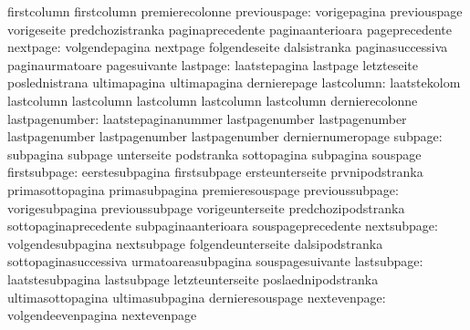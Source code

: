                            firstcolumn               firstcolumn
                           premierecolonne
             previouspage: vorigepagina              previouspage
                           vorigeseite               predchozistranka
                           paginaprecedente          paginaanterioara
                           pageprecedente
                 nextpage: volgendepagina            nextpage
                           folgendeseite             dalsistranka
                           paginasuccessiva          paginaurmatoare
                           pagesuivante
                 lastpage: laatstepagina             lastpage
                           letzteseite               poslednistrana
                           ultimapagina              ultimapagina
                           dernierepage
               lastcolumn: laatstekolom              lastcolumn
                           lastcolumn                lastcolumn
                           lastcolumn                lastcolumn
                           dernierecolonne
           lastpagenumber: laatstepaginanummer       lastpagenumber
                           lastpagenumber            lastpagenumber
                           lastpagenumber            lastpagenumber
                           derniernumeropage
                  subpage: subpagina                 subpage
                           unterseite                podstranka
                           sottopagina               subpagina
                           souspage
             firstsubpage: eerstesubpagina           firstsubpage
                           ersteunterseite           prvnipodstranka
                           primasottopagina          primasubpagina
                           premieresouspage
          previoussubpage: vorigesubpagina           previoussubpage
                           vorigeunterseite          predchozipodstranka
                           sottopaginaprecedente     subpaginaanterioara
                           souspageprecedente
              nextsubpage: volgendesubpagina         nextsubpage
                           folgendeunterseite        dalsipodstranka
                           sottopaginasuccessiva     urmatoareasubpagina
                           souspagesuivante
              lastsubpage: laatstesubpagina          lastsubpage
                           letzteunterseite          poslaednipodstranka
                           ultimasottopagina         ultimasubpagina
                           dernieresouspage
             nextevenpage: volgendeevenpagina        nextevenpage
